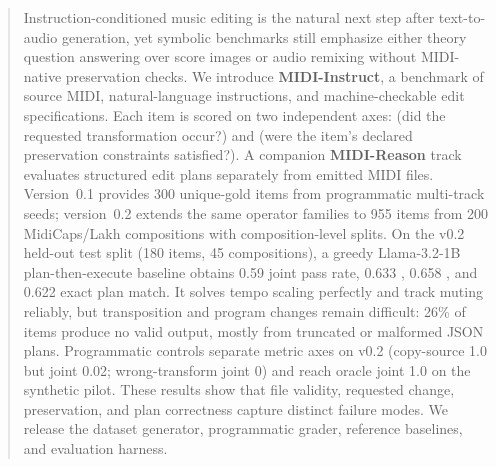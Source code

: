 \begin{abstract}
Instruction-conditioned music editing is the natural next step after text-to-audio generation, yet symbolic benchmarks still emphasize either theory question answering over score images or audio remixing without MIDI-native preservation checks. We introduce \textbf{MIDI-Instruct}, a benchmark of source MIDI, natural-language instructions, and machine-checkable edit specifications. Each item is scored on two independent axes: \edit{} (did the requested transformation occur?) and \preserve{} (were the item's declared preservation constraints satisfied?). A companion \textbf{MIDI-Reason} track evaluates structured edit plans separately from emitted MIDI files. Version~0.1 provides 300 unique-gold items from programmatic multi-track seeds; version~0.2 extends the same operator families to 955 items from 200 MidiCaps/Lakh compositions with composition-level splits. On the v0.2 held-out test split (180 items, 45 compositions), a greedy Llama-3.2-1B plan-then-execute baseline obtains 0.59 joint pass rate, 0.633 \edit{}, 0.658 \preserve{}, and 0.622 exact plan match. It solves tempo scaling perfectly and track muting reliably, but transposition and program changes remain difficult: 26\% of items produce no valid output, mostly from truncated or malformed JSON plans. Programmatic controls separate metric axes on v0.2 (copy-source \preserve{} 1.0 but joint 0.02; wrong-transform joint 0) and reach oracle joint 1.0 on the synthetic pilot. These results show that file validity, requested change, preservation, and plan correctness capture distinct failure modes. We release the dataset generator, programmatic grader, reference baselines, and evaluation harness.
\end{abstract}
